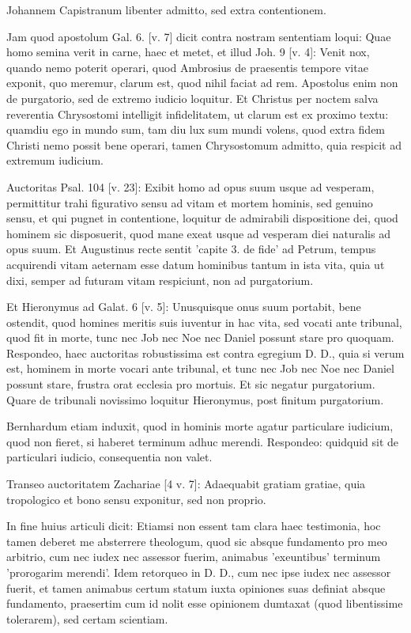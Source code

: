 Johannem Capistranum libenter admitto, sed extra contentionem.

Jam quod apostolum Gal. 6. [v. 7] dicit contra nostram sententiam loqui: Quae homo semina verit in carne, haec et metet, et illud Joh. 9 [v. 4]: Venit nox, quando nemo poterit operari, quod Ambrosius de praesentis tempore vitae exponit, quo meremur, clarum est, quod nihil faciat ad rem. Apostolus enim non de purgatorio, sed de extremo iudicio loquitur. Et Christus per noctem salva reverentia Chrysostomi intelligit infidelitatem, ut clarum est ex proximo textu: quamdiu ego in mundo sum, tam diu lux sum mundi volens, quod extra fidem Christi nemo possit bene operari, tamen Chrysostomum admitto, quia respicit ad extremum iudicium.

Auctoritas Psal. 104 [v. 23]: Exibit homo ad opus suum usque ad vesperam, permittitur trahi figurativo sensu ad vitam et mortem hominis, sed genuino sensu, et qui pugnet in contentione, loquitur de admirabili dispositione dei, \marginpar{\small[332]} quod hominem sic disposuerit, quod mane exeat usque ad vesperam diei naturalis ad opus suum. Et Augustinus recte sentit 'capite 3. de fide' ad Petrum, tempus acquirendi vitam aeternam esse datum hominibus tantum in ista vita, quia ut dixi, semper ad futuram vitam respiciunt, non ad purgatorium.

Et Hieronymus ad Galat. 6 [v. 5]: Unusquisque onus suum portabit, bene ostendit, quod homines meritis suis iuventur in hac vita, sed vocati ante tribunal, quod fit in morte, tunc nec Job nec Noe nec Daniel possunt stare pro quoquam. Respondeo, haec auctoritas robustissima est contra egregium D. D., quia si verum est, hominem in morte vocari ante tribunal, et tunc nec Job nec Noe nec Daniel possunt stare, frustra orat ecclesia pro mortuis. Et sic negatur purgatorium. Quare de tribunali novissimo loquitur Hieronymus, post finitum purgatorium.

Bernhardum etiam induxit, quod in hominis morte agatur particulare iudicium, quod non fieret, si haberet terminum adhuc merendi. Respondeo: quidquid sit de particulari iudicio, consequentia non valet.

Transeo auctoritatem Zachariae [4 v. 7]: Adaequabit gratiam gratiae, quia tropologico et bono sensu exponitur, sed non proprio.

In fine huius articuli dicit: Etiamsi non essent tam clara haec testimonia, hoc tamen deberet me absterrere theologum, quod sic absque fundamento pro meo arbitrio, cum nec iudex nec assessor fuerim, animabus 'exeuntibus' terminum 'prorogarim merendi'. Idem retorqueo in D. D., cum nec ipse iudex nec assessor fuerit, et tamen animabus certum statum iuxta opiniones suas definiat absque fundamento, praesertim cum id nolit esse opinionem dumtaxat (quod libentissime tolerarem), sed certam scientiam.

